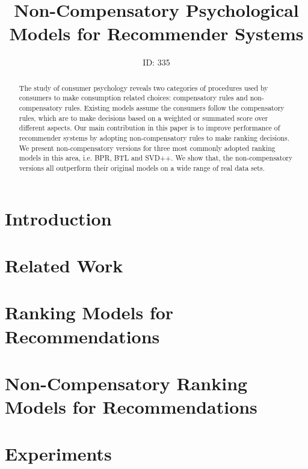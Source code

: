 \documentclass[letterpaper]{article} %
\begin{document}
%
\title{Non-Compensatory Psychological Models for Recommender Systems}
\author{ID: 335
}
\maketitle
\begin{abstract}
The study of consumer psychology reveals two categories of procedures used by consumers to make consumption related choices: compensatory rules and non-compensatory rules. Existing models assume the consumers follow the compensatory rules, which are to make decisions based on a weighted or summated score over different aspects. Our main contribution in this paper is to improve performance of recommender systems by adopting non-compensatory rules to make ranking decisions.  We present non-compensatory versions for three most commonly adopted ranking models in this area, i.e. BPR, BTL and SVD++. We show that, the non-compensatory versions all outperform their original models on a wide range of real data sets. 
\end{abstract}



\section{Introduction}


\section{Related Work}

\section{Ranking Models for Recommendations}

\section{Non-Compensatory Ranking Models for Recommendations}

\section{Experiments}
\end{document}
